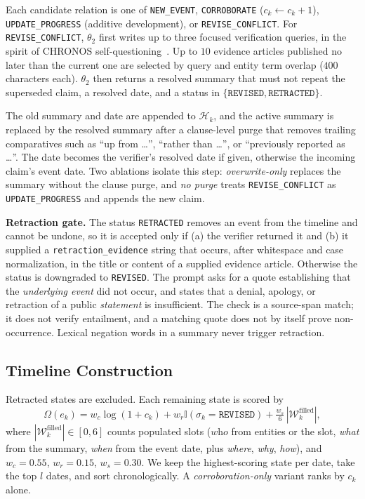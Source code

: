 \documentclass[journal]{IEEEtran}
\begin{document}
Each candidate relation is one of \texttt{NEW\_EVENT}, \texttt{CORROBORATE} ($c_k\leftarrow c_k+1$), \texttt{UPDATE\_PROGRESS} (additive development), or \texttt{REVISE\_CONFLICT}. For \texttt{REVISE\_CONFLICT}, $\theta_2$ first writes up to three focused verification queries, in the spirit of CHRONOS self-questioning~\cite{wu2025unfolding}. Up to $10$ evidence articles published no later than the current one are selected by query and entity term overlap ($400$ characters each). $\theta_2$ then returns a resolved summary that must not repeat the superseded claim, a resolved date, and a status in $\{\texttt{REVISED},\texttt{RETRACTED}\}$.

The old summary and date are appended to $\mathcal{H}_k$, and the active summary is replaced by the resolved summary after a clause-level purge that removes trailing comparatives such as ``up from \dots'', ``rather than \dots'', or ``previously reported as \dots''. The date becomes the verifier's resolved date if given, otherwise the incoming claim's event date. Two ablations isolate this step: \emph{overwrite-only} replaces the summary without the clause purge, and \emph{no purge} treats \texttt{REVISE\_CONFLICT} as \texttt{UPDATE\_PROGRESS} and appends the new claim.

\textbf{Retraction gate.} The status \texttt{RETRACTED} removes an event from the timeline and cannot be undone, so it is accepted only if (a) the verifier returned it and (b) it supplied a \texttt{retraction\_evidence} string that occurs, after whitespace and case normalization, in the title or content of a supplied evidence article. Otherwise the status is downgraded to \texttt{REVISED}. The prompt asks for a quote establishing that the \emph{underlying event} did not occur, and states that a denial, apology, or retraction of a public \emph{statement} is insufficient. The check is a source-span match; it does not verify entailment, and a matching quote does not by itself prove non-occurrence. Lexical negation words in a summary never trigger retraction.

\subsection{Timeline Construction}
\label{subsec:timeline_construction}

Retracted states are excluded. Each remaining state is scored by
\begin{equation}
\Omega(e_k) = w_c \log(1 + c_k) + w_r \mathbb{I}(\sigma_k\!=\!\texttt{REVISED}) + \tfrac{w_s}{6}\,|\mathcal{W}_k^{\text{filled}}|,
\label{eq:salience_score}
\end{equation}
where $|\mathcal{W}_k^{\text{filled}}|\in[0,6]$ counts populated slots ($\textit{who}$ from entities or the slot, \textit{what} from the summary, \textit{when} from the event date, plus \textit{where}, \textit{why}, \textit{how}), and $w_c=0.55$, $w_r=0.15$, $w_s=0.30$. We keep the highest-scoring state per date, take the top $l$ dates, and sort chronologically. A \emph{corroboration-only} variant ranks by $c_k$ alone.
\end{document}
